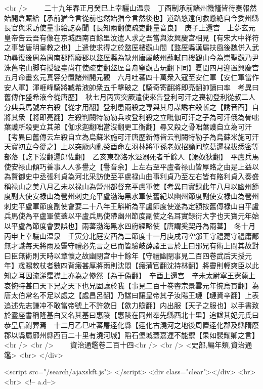 <br />
　　二十九年春正月癸巳上幸驪山温泉　丁酉制承前諸州饑饉皆待奏報然始開倉賑給【承前猶今言從前也然始猶今言然後也】道路悠遠何救懸絶自今委州縣長官與采訪使量事給訖奏聞【長知兩翻使疏吏翻量音良】　庚子上還宫　上夢玄元皇帝告云吾有像在京城西南百餘里汝遣人求之吾當與汝興慶宫相見【有宋大中祥符之事皆唐明皇教之也】上遣使求得之於盩厔樓觀山間【盩厔縣漢屬扶風後魏併入武功尋復後周為周南郡隋廢郡以盩厔縣為缺州唐屬岐州蘇軾曰樓觀山今為崇聖觀乃尹洙舊宅山脚有授經臺尚在使疏吏翻盩厔音舟窒觀古玩翻下同】夏閏四月迎置興慶宫五月命畫玄元真容分置諸州開元觀　六月吐蕃四十萬衆入寇至安仁軍【安仁軍當作安人軍】渾崕峰騎將臧希液帥衆五千擊破之【騎奇寄翻將即亮翻帥讀曰率　考異曰舊傳作盛希液今從唐歷】　秋七月丙寅突厥遣使來告登利可汗之喪初登利從叔二人分典兵馬號左右殺【從才用翻】登利患兩殺之專與其母謀誘右殺斬之【誘音酉】自將其衆【將即亮翻】左殺判闕特勒勒兵攻登利殺之立毗伽可汗之子為可汗俄為骨咄葉護所殺更立其弟【伽求迦翻咄當沒翻更工衡翻】尋又殺之骨咄葉護自立為可汗【考異曰舊傳云左殺自立為烏蘇米施可汗唐歷新傳皆云判闕特勒子為烏蘇米施可汗天寶初立今從之】上以突厥内亂癸酉命左羽林將軍孫老奴招諭囘紇葛邏禄拔悉密等部落【訖下沒翻邏郎佐翻】　乙亥東都洛水溢溺死者千餘人【溺奴狄翻】　平盧兵馬使安禄山傾巧善事人人多譽之【譽音余】上左右至平盧者禄山皆厚賂之由是上益以為賢御史中丞張利貞為河北采訪使至平盧禄山曲事利貞乃至左右皆有賂利貞入奏盛稱禄山之美八月乙未以禄山為營州都督充平盧軍使【考異曰實録此年八月以幽州節度副大使安禄山為營州刺史充平盧渤海黑水軍使舊紀以幽州節度副使安禄山為營州刺史平盧軍節度副使會要二十八年王斛斯為平盧節度使遂為定額按舊傳禄山自平盧兵馬使為平盧軍使蓋以平盧兵馬使帶幽州節度副使之名耳實録衍大字也天寶元年始以平盧為節度會要誤也】兩蕃渤海黑水四府經略使【唐謂奚契丹為兩蕃】　冬十月丙申上幸驪山温泉　壬寅分北庭安西為二節度十一月庚戌司空邠王守禮薨守禮庸鄙無才識每天將雨及霽守禮必先言之已而皆驗岐薛諸王言於上曰邠兄有術上問其故對曰臣無術則天時以章懷之故幽閉宫中十餘年【守禮幽閉事見二百四卷武后天授元年】歲賜敕杖者數四背瘢甚厚將雨則沈悶【瘢蒲官翻沈持林翻】將霽則輕爽臣以此知之耳因流涕霑襟上亦為之慘然【為于偽翻】　辛酉上還宫　辛未太尉寧王憲薨上哀惋特甚曰天下兄之天下也兄固讓於我【事見二百十卷睿宗景雲元年惋烏貫翻】為唐太伯常名不足以處之【處昌呂翻】乃諡曰讓皇帝其子汝陽王璉【璉資辛翻】上表追述先志謙冲不敢當帝號上不許歛日【歛力贍翻】内出服【天子之服也】以手書致於靈座書稱隆基白又名其基曰惠陵【惠陵在同州奉先縣西北十里】追諡其妃元氏曰恭皇后祔葬焉　十二月乙巳吐蕃屠逹化縣【逹化古澆河之地後周置逹化郡及縣隋廢郡以縣屬廓州縣西百二十里有澆河城】䧟石堡城蓋嘉運不能禦【果如裴耀卿之言】<br />
<br />
　　資治通鑑卷二百十四<br />
<br />
<史部,編年類,資治通鑑>  <br>
   </div> 

<script src="/search/ajaxskft.js"> </script>
 <div class="clear"></div>
<br>
<br>
 <!-- a.d-->


